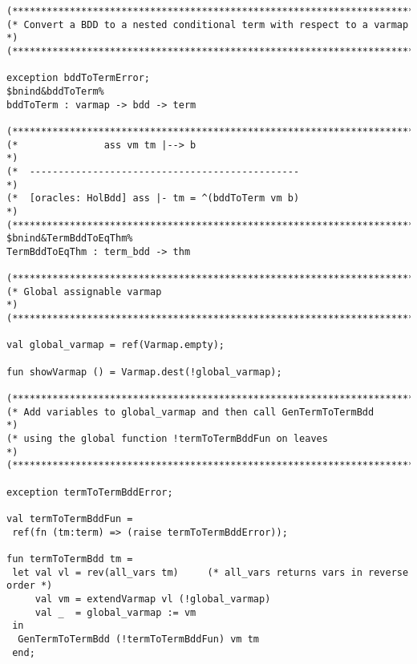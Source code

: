 \documentclass[12pt]{article}
\begin{document}
\begin{footnotesize}
\begin{Verbatim}[commandchars=\$\&\%]
(*****************************************************************************)
(* Convert a BDD to a nested conditional term with respect to a varmap       *)
(*****************************************************************************)

exception bddToTermError;
$bnind&bddToTerm%
bddToTerm : varmap -> bdd -> term

(*****************************************************************************)
(*               ass vm tm |--> b                                            *)
(*  -----------------------------------------------                          *)
(*  [oracles: HolBdd] ass |- tm = ^(bddToTerm vm b)                          *)
(*****************************************************************************)
$bnind&TermBddToEqThm%
TermBddToEqThm : term_bdd -> thm

(*****************************************************************************)
(* Global assignable varmap                                                  *)
(*****************************************************************************)

val global_varmap = ref(Varmap.empty);

fun showVarmap () = Varmap.dest(!global_varmap);

(*****************************************************************************)
(* Add variables to global_varmap and then call GenTermToTermBdd             *)
(* using the global function !termToTermBddFun on leaves                     *)
(*****************************************************************************)

exception termToTermBddError;

val termToTermBddFun = 
 ref(fn (tm:term) => (raise termToTermBddError));

fun termToTermBdd tm =
 let val vl = rev(all_vars tm)     (* all_vars returns vars in reverse order *)
     val vm = extendVarmap vl (!global_varmap)
     val _  = global_varmap := vm
 in
  GenTermToTermBdd (!termToTermBddFun) vm tm
 end;




\end{Verbatim}
\end{footnotesize}
\end{document}
